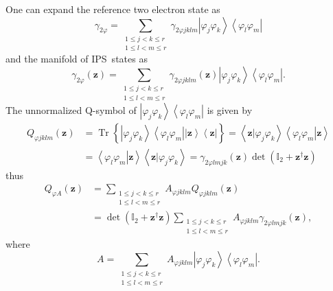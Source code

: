 \documentclass[aps,preprint]{revtex4}%
\begin{document}
One can expand the reference two electron state as
\begin{equation}
\gamma_{2\varphi}=\sum_{\substack{1\leq j<k\leq r\\1\leq l<m\leq r}%
}\gamma_{2\varphi jklm}\left\vert \varphi_{j}\varphi_{k}\right\rangle
\left\langle \varphi_{l}\varphi_{m}\right\vert
\end{equation}
and the manifold of IPS\ states as
\begin{equation}
\gamma_{2\varphi}\left(  \mathbf{z}\right)  =\sum_{\substack{1\leq j<k\leq
r\\1\leq l<m\leq r}}\gamma_{2\varphi jklm}\left(  \mathbf{z}\right)
\left\vert \varphi_{j}\varphi_{k}\right\rangle \left\langle \varphi_{l}%
\varphi_{m}\right\vert .
\end{equation}
The unnormalized Q-symbol of $\left\vert \varphi_{j}\varphi_{k}\right\rangle
\left\langle \varphi_{l}\varphi_{m}\right\vert $ is given by
\begin{align}
Q_{\varphi jklm}\left(  \mathbf{z}\right)   &  =\operatorname*{Tr}\left\{
\left\vert \varphi_{j}\varphi_{k}\right\rangle \left\langle \varphi_{l}%
\varphi_{m}\right\vert \left\vert \mathbf{z}\right\rangle \left\langle
\mathbf{z}\right\vert \right\}  =\left\langle \left.  \mathbf{z}\right\vert
\varphi_{j}\varphi_{k}\right\rangle \left\langle \left.  \varphi_{l}%
\varphi_{m}\right\vert \mathbf{z}\right\rangle \nonumber\\
&  =\left\langle \left.  \varphi_{l}\varphi_{m}\right\vert \mathbf{z}%
\right\rangle \left\langle \left.  \mathbf{z}\right\vert \varphi_{j}%
\varphi_{k}\right\rangle =\gamma_{2\varphi lmjk}\left(  \mathbf{z}\right)
\det\left(  \mathbb{I}_{2}+\mathbf{z}^{\dagger}\mathbf{z}\right)
\end{align}
thus
\begin{align}
Q_{\varphi A}\left(  \mathbf{z}\right)   &  =\sum_{\substack{1\leq j<k\leq
r\\1\leq l<m\leq r}}A_{\varphi jklm}Q_{\varphi jklm}\left(  \mathbf{z}\right)
\nonumber\\
&  =\det\left(  \mathbb{I}_{2}+\mathbf{z}^{\dagger}\mathbf{z}\right)
\sum_{\substack{1\leq j<k\leq r\\1\leq l<m\leq r}}A_{\varphi jklm}%
\gamma_{2\varphi lmjk}\left(  \mathbf{z}\right)  ,
\end{align}
where
\begin{equation}
A=\sum_{\substack{1\leq j<k\leq r\\1\leq l<m\leq r}}A_{\varphi jklm}\left\vert
\varphi_{j}\varphi_{k}\right\rangle \left\langle \varphi_{l}\varphi
_{m}\right\vert .
\end{equation}
\end{document}
